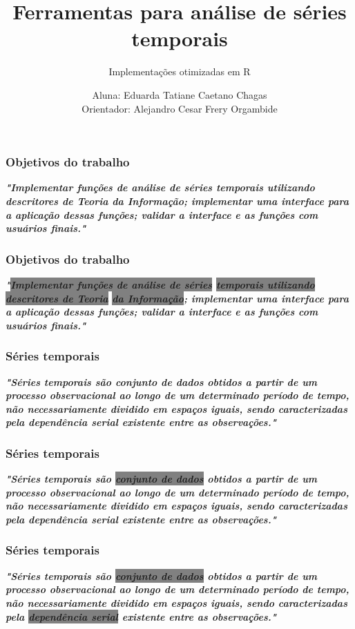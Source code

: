 \documentclass[10pt, compress]{beamer}
\title{\LARGE Ferramentas para análise de séries temporais}
\subtitle{Implementações otimizadas em R}
\author{Aluna: Eduarda Tatiane Caetano Chagas\\Orientador: Alejandro Cesar Frery Orgambide}
\institute{LaCCAN – Laboratório de análise e computação científica}
\begin{document}
\maketitle


\begin{frame}[fragile]
\frametitle{Objetivos do trabalho}
\begin{sloppypar}
\textit{\textbf{\Large "Implementar funções de análise de séries temporais utilizando descritores de Teoria da Informação; implementar uma interface para a aplicação
dessas funções; validar a interface e as funções com usuários finais."}}
\end{sloppypar}
\end{frame}

\begin{frame}[fragile]
\frametitle{Objetivos do trabalho}
\begin{sloppypar}
\textit{\textbf{\Large "\colorbox{gray}{Implementar funções de análise de séries} \colorbox{gray}{temporais utilizando descritores de Teoria} \colorbox{gray}{da Informação}; implementar uma interface para a aplicação
dessas funções; validar a interface e as funções com usuários finais."}}
\end{sloppypar}
\end{frame}

\begin{frame}[fragile]
\frametitle{Séries temporais}
\begin{sloppypar}
\textit{\textbf{\Large "Séries temporais são conjunto de dados obtidos
a partir de um processo observacional ao longo de um determinado período de tempo, não necessariamente dividido em espaços iguais, sendo caracterizadas pela dependência serial existente entre as observações."}}
\end{sloppypar}
\end{frame}

\begin{frame}[fragile]
\frametitle{Séries temporais}
\begin{sloppypar}
\textit{\textbf{\Large "Séries temporais são \colorbox{gray}{conjunto de dados} obtidos
a partir de um processo observacional ao longo de um determinado período de tempo, não necessariamente dividido em espaços iguais, sendo caracterizadas pela dependência serial existente entre as observações."}}
\end{sloppypar}
\end{frame}

\begin{frame}[fragile]
\frametitle{Séries temporais}
\begin{sloppypar}
\textit{\textbf{\Large "Séries temporais são \colorbox{gray}{conjunto de dados} obtidos
a partir de um processo observacional ao longo de um determinado período de tempo, não necessariamente dividido em espaços iguais, sendo caracterizadas pela \colorbox{gray}{dependência serial} existente entre as observações."}}
\end{sloppypar}
\end{frame}
\end{document}

